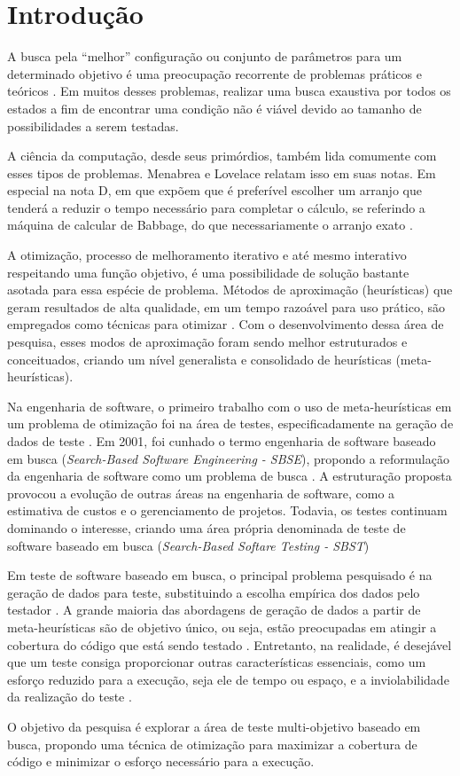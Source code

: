 \chapter[Introdução]{Introdução}

A busca pela ``melhor'' configuração ou conjunto de parâmetros para um
determinado objetivo é uma preocupação recorrente de problemas práticos e
teóricos \cite{combinatorialoptimization1998}. Em muitos desses problemas,
realizar uma busca exaustiva por todos os estados a fim de encontrar uma
condição não é viável devido ao tamanho de possibilidades a serem testadas. 

A ciência da computação, desde seus primórdios, também lida comumente com esses tipos de problemas. Menabrea e Lovelace relatam isso em suas notas. Em especial na nota D, em que expõem que é preferível escolher um arranjo que
tenderá a reduzir o tempo necessário para completar o cálculo, se referindo a
máquina de calcular de Babbage, do que necessariamente o arranjo exato
\cite{menabrea1842sketch}.

A otimização, processo de melhoramento iterativo e até mesmo interativo respeitando uma função objetivo, é uma possibilidade de solução bastante asotada para essa espécie de problema. Métodos de aproximação (heurísticas) que geram
resultados de alta qualidade, em um tempo razoável para uso prático, são empregados como técnicas para otimizar \cite{gendreau2005metaheuristics}. Com o desenvolvimento dessa área de
pesquisa, esses modos de aproximação foram sendo melhor estruturados e
conceituados, criando um nível generalista e consolidado de heurísticas (meta-heurísticas).

Na engenharia de software, o primeiro trabalho com o uso de meta-heurísticas em um problema de 
otimização foi na área de testes, especificadamente na geração de dados de teste \cite{miller1976automatic}. Em 2001, foi cunhado o termo engenharia de software baseado em busca (\textit{Search-Based Software Engineering - SBSE}), propondo a reformulação da engenharia de software como um problema de busca \cite{harman2001search}. A estruturação proposta provocou a evolução de outras áreas na engenharia de software, como a estimativa de custos e o gerenciamento de projetos. Todavia, os testes continuam dominando o interesse, criando uma área própria denominada de teste de software baseado em busca (\textit{Search-Based Softare Testing - SBST}) \cite{harman2012search}

Em teste de software baseado em busca, o principal problema pesquisado é na geração de dados para teste, substituindo a escolha empírica dos dados pelo testador \cite{mcminn2004search}. A grande maioria das abordagens de geração de dados a partir de meta-heurísticas são de objetivo único, ou seja, estão preocupadas em atingir a cobertura do código que está sendo testado \cite{harman2015achievements}. Entretanto, na realidade, é desejável que um teste consiga proporcionar outras características essenciais, como um esforço reduzido para a execução, seja ele de tempo ou espaço, e a inviolabilidade da realização do teste \cite{harman2015achievements}.

O objetivo da pesquisa é explorar a área de teste multi-objetivo baseado em busca, propondo uma técnica de otimização para maximizar a cobertura de código e minimizar o esforço necessário para a execução. 

 




